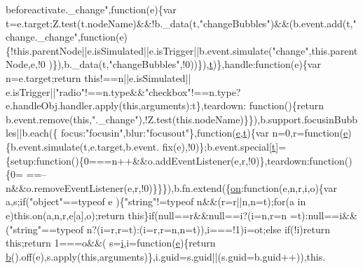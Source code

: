 \begin{DoxyCode}
{{{      beforeactivate.\_change"},\textcolor{keyword}{function}(e)\{var t=e.target;Z.test(t.nodeName)&&!b.\_data(t,\textcolor{stringliteral}{"changeBubbles"})&&(b.event.add(t,\textcolor{stringliteral}{"
      change.\_change"},\textcolor{keyword}{function}(e)\{!this.parentNode||e.isSimulated||e.isTrigger||b.event.simulate(\textcolor{stringliteral}{"change"},this.parentNode,e,!0
      )\}),b.\_data(t,\textcolor{stringliteral}{"changeBubbles"},!0))\}),\hyperlink{jquery-1_89_81_8min_8js_a23c5666e83bbbceee94adcd0851f50c4}{t})\},handle:\textcolor{keyword}{function}(e)\{var n=e.target;\textcolor{keywordflow}{return} \textcolor{keyword}{this}!==n||e.isSimulated||
      e.isTrigger||\textcolor{stringliteral}{"radio"}!==n.type&&\textcolor{stringliteral}{"checkbox"}!==n.type?e.handleObj.handler.apply(\textcolor{keyword}{this},arguments):t\},teardown:\textcolor{keyword}{
      function}()\{\textcolor{keywordflow}{return} b.event.remove(\textcolor{keyword}{this},\textcolor{stringliteral}{".\_change"}),!Z.test(this.nodeName)\}\}),b.support.focusinBubbles||b.each(\{
      focus:\textcolor{stringliteral}{"focusin"},blur:\textcolor{stringliteral}{"focusout"}\},\textcolor{keyword}{function}(\hyperlink{jquery-1_89_81_8min_8js_a2c038346d47955cbe2cb91e338edd7e1}{e},\hyperlink{jquery-1_89_81_8min_8js_a23c5666e83bbbceee94adcd0851f50c4}{t})\{var n=0,r=\textcolor{keyword}{function}(\hyperlink{jquery-1_89_81_8min_8js_a2c038346d47955cbe2cb91e338edd7e1}{e})\{b.event.simulate(t,e.target,b.event.
      fix(e),!0)\};b.event.special[\hyperlink{jquery-1_89_81_8min_8js_a23c5666e83bbbceee94adcd0851f50c4}{t}]=\{setup:\textcolor{keyword}{function}()\{0===n++&&o.addEventListener(e,r,!0)\},teardown:\textcolor{keyword}{function}()\{0=
      ==--n&&o.removeEventListener(e,r,!0)\}\}\}),b.fn.extend(\{\hyperlink{jquery-1_89_81_8min_8js_a5ecbff4c4e7972cd3a799b422038b564}{on}:\textcolor{keyword}{function}(e,n,r,i,o)\{var a,s;\textcolor{keywordflow}{if}(\textcolor{stringliteral}{"object"}==typeof e
      )\{\textcolor{stringliteral}{"string"}!=typeof n&&(r=r||n,n=t);\textcolor{keywordflow}{for}(a in e)\textcolor{keyword}{this}.on(a,n,r,e[a],o);\textcolor{keywordflow}{return} \textcolor{keyword}{this}\}\textcolor{keywordflow}{if}(null==r&&null==i?(i=n,r=n
      =t):null==i&&(\textcolor{stringliteral}{"string"}==typeof n?(i=r,r=t):(i=r,r=n,n=t)),i===!1)i=ot;\textcolor{keywordflow}{else} \textcolor{keywordflow}{if}(!i)\textcolor{keywordflow}{return} \textcolor{keyword}{this};\textcolor{keywordflow}{return} 1===o&&(
      s=\hyperlink{jquery-1_89_81_8min_8js_a7e98b8a17c0aad30ba64d47b74e2a6c1}{i},i=\textcolor{keyword}{function}(\hyperlink{jquery-1_89_81_8min_8js_a2c038346d47955cbe2cb91e338edd7e1}{e})\{\textcolor{keywordflow}{return} \hyperlink{jquery-1_89_81_8min_8js_ac50ac660762310348a84d5558c651020}{b}().off(e),s.apply(\textcolor{keyword}{this},arguments)\},i.guid=s.guid||(s.guid=b.guid++)),this.
}}
\end{DoxyCode}
